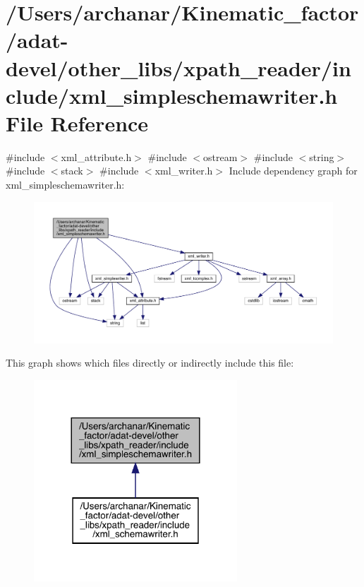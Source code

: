 \hypertarget{adat-devel_2other__libs_2xpath__reader_2include_2xml__simpleschemawriter_8h}{}\section{/\+Users/archanar/\+Kinematic\+\_\+factor/adat-\/devel/other\+\_\+libs/xpath\+\_\+reader/include/xml\+\_\+simpleschemawriter.h File Reference}
\label{adat-devel_2other__libs_2xpath__reader_2include_2xml__simpleschemawriter_8h}
{\ttfamily \#include $<$xml\+\_\+attribute.\+h$>$}\newline
{\ttfamily \#include $<$ostream$>$}\newline
{\ttfamily \#include $<$string$>$}\newline
{\ttfamily \#include $<$stack$>$}\newline
{\ttfamily \#include $<$xml\+\_\+writer.\+h$>$}\newline
Include dependency graph for xml\+\_\+simpleschemawriter.\+h\+:
\nopagebreak
\begin{figure}[H]
\begin{center}
\leavevmode
\includegraphics[width=350pt]{d8/d36/adat-devel_2other__libs_2xpath__reader_2include_2xml__simpleschemawriter_8h__incl}
\end{center}
\end{figure}
This graph shows which files directly or indirectly include this file\+:
\nopagebreak
\begin{figure}[H]
\begin{center}
\leavevmode
\includegraphics[width=216pt]{d3/d7c/adat-devel_2other__libs_2xpath__reader_2include_2xml__simpleschemawriter_8h__dep__incl}
\end{center}
\end{figure}
